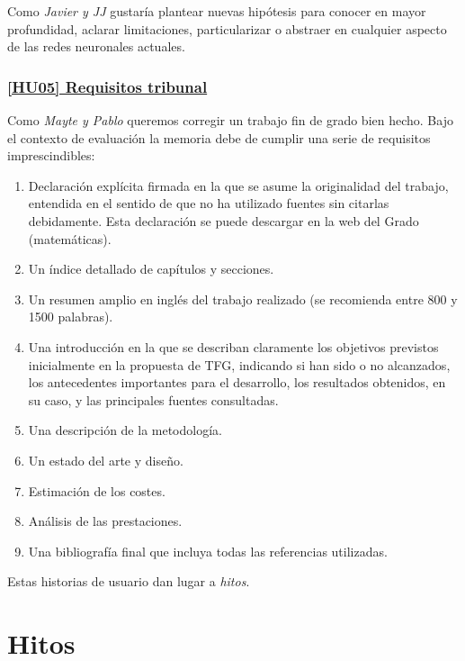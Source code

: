 Como \textit{Javier y JJ} gustaría plantear nuevas hipótesis para conocer en mayor profundidad, 
aclarar limitaciones, particularizar o abstraer en cualquier aspecto de las redes neuronales actuales.

\subsubsection*{
    \href{https://github.com/BlancaCC/TFG-Estudio-de-las-redes-neuronales/issues/49}{[HU05] Requisitos tribunal}
} \label{HUO6}
Como \textit{Mayte y Pablo} queremos corregir un trabajo fin de grado bien hecho. 
Bajo el contexto de evaluación la memoria debe de cumplir una serie de requisitos imprescindibles:

\begin{enumerate}
    \item Declaración explícita firmada en la que se asume la originalidad del trabajo, entendida en el sentido de que no ha utilizado fuentes sin citarlas debidamente. Esta declaración se puede descargar en la web del Grado (matemáticas).
    \item Un índice detallado de capítulos y secciones.
    \item Un resumen amplio en inglés del trabajo realizado (se recomienda entre 800 y 1500 palabras).
    \item Una introducción en la que se describan claramente los objetivos previstos inicialmente en la propuesta de TFG, indicando si han sido o no alcanzados, los antecedentes importantes para el desarrollo, los resultados obtenidos, en su caso, y las principales fuentes consultadas.
    \item Una descripción de la metodología.
    \item Un estado del arte y diseño.
    \item Estimación de los costes.
    \item Análisis de las prestaciones.
    \item Una bibliografía final que incluya todas las referencias utilizadas.
\end{enumerate}


Estas historias de usuario dan lugar a \textit{hitos}. 

\section{Hitos} \label{ch00:hitos} 

